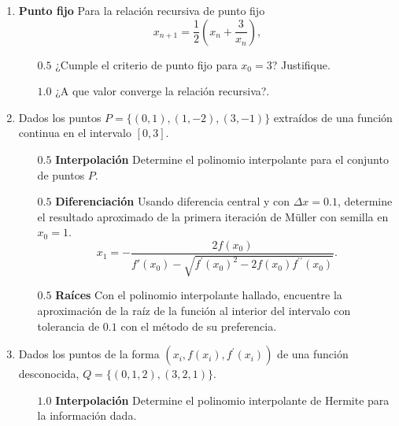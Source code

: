 \documentclass[12pt]{article}
\begin{document}
  \begin{enumerate}[leftmargin=*,widest=9]

    \item \textbf{Punto fijo} Para la relación recursiva de punto fijo \[x_{n+1} = \frac{1}{2} \left(x_n + \frac{3}{x_n} \right),\]
    \begin{itemize}
    \item[$0.5$] ¿Cumple el criterio de punto fijo para $x_0 = 3$? Justifique.

    \vspace{3.5cm}

    \item[$1.0$] ¿A que valor converge la relación recursiva?.

    \vspace{2cm}

    \end{itemize}


 \item Dados los puntos $P=\lbrace (0, 1), (1, {-2}), (3, {-1}) \rbrace$ extraídos de una función continua en el intervalo $\left[0, 3\right]$.

    \begin{itemize}
    \item[$0.5$] \textbf{Interpolación} Determine el polinomio interpolante para el conjunto de puntos $P$.

    \vspace{5cm}

    \item[$0.5$] \textbf{Diferenciación} Usando diferencia central y con $\Delta x = 0.1$, determine el resultado aproximado de la primera iteración de M\"uller con semilla en $x_0=1$.
    \[
    x_1 = -\frac{2f(x_0)}{f\prime(x_0)-\sqrt{f^\prime(x_0)^2 - 2f(x_0)f^{\prime\prime}(x_0)}}.
    \]

    \vspace{4cm}

    \item[$0.5$] \textbf{Raíces} Con el polinomio interpolante hallado, encuentre la aproximación de la raíz de la función al interior del intervalo con tolerancia de $0.1$ con el método de su preferencia.

    \vspace{5cm}

    \end{itemize}


    \item Dados los puntos de la forma $(x_i, f(x_i), f^\prime (x_i))$ de una función desconocida, $Q=\lbrace (0, 1, 2), (3, 2, 1) \rbrace$.
    \begin{itemize}
    \item[$1.0$] \textbf{Interpolación} Determine el polinomio interpolante de Hermite para la información dada.


\end{itemize}
\end{enumerate}
\end{document}
